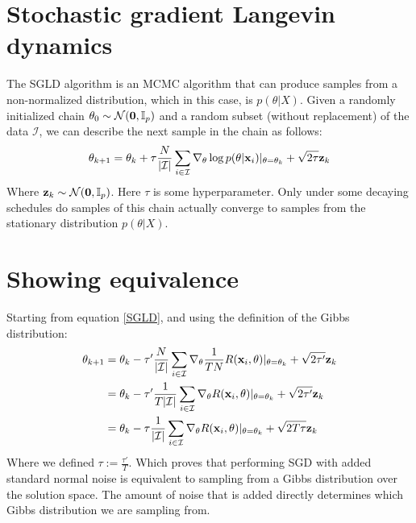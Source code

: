 \documentclass[twocolumn]{article}
\begin{document}
\section{Stochastic gradient Langevin dynamics}
The SGLD algorithm \cite{welling2011bayesian} is an MCMC algorithm that can produce samples from a non-normalized distribution, which in this case, is $p(\theta|X)$. Given a randomly initialized chain $\theta_0 \sim \mathcal{N}(
\bold{0}, \mathbb{I}_p)$ and a random subset (without replacement) of the data $\mathcal{I}$, we can describe the next sample in the chain as follows:
\begin{align}
  \theta_{k+1} = \theta_{k} + \tau \frac{N}{|\mathcal{I}|}\sum_{i \in \mathcal{I}} \nabla_{\theta}\log p(\theta|\bold{x}_i)|_{\theta = \theta_k} + \sqrt{2\tau}\bold{z}_k \label{SGLD}
\end{align}
Where $\bold{z}_k \sim \mathcal{N}(\bold{0}, \mathbb{I}_p)$. Here $\tau$ is some hyperparameter. Only under some decaying schedules do samples of this chain actually converge to samples from the stationary distribution $p(\theta|X)$.

\section{Showing equivalence}
Starting from equation \ref{SGLD}, and using the definition of the Gibbs distribution:
\begin{align*}
  \theta_{k+1} &= \theta_k - \tau' \frac{N}{|\mathcal{I}|}\sum_{i \in \mathcal{I}} \nabla_{\theta}\frac{1}{TN}R(\bold{x}_i, \theta)|_{\theta = \theta_k} + \sqrt{2\tau'}\bold{z}_k\\
          &= \theta_k - \tau' \frac{1}{T|\mathcal{I}|}\sum_{i \in \mathcal{I}} \nabla_{\theta}R(\bold{x}_i, \theta)|_{\theta = \theta_k} + \sqrt{2\tau'}\bold{z}_k\\
          &= \theta_k - \tau \frac{1}{|\mathcal{I}|}\sum_{i \in \mathcal{I}} \nabla_{\theta}R(\bold{x}_i, \theta)|_{\theta = \theta_k} + \sqrt{2T\tau}\bold{z}_k\\
\end{align*}
Where we defined $\tau := \frac{\tau'}{T}$. Which proves that performing SGD with added standard normal noise is equivalent to sampling from a Gibbs distribution over the solution space. The amount of noise that is added directly determines which Gibbs distribution we are sampling from.
\end{document}
